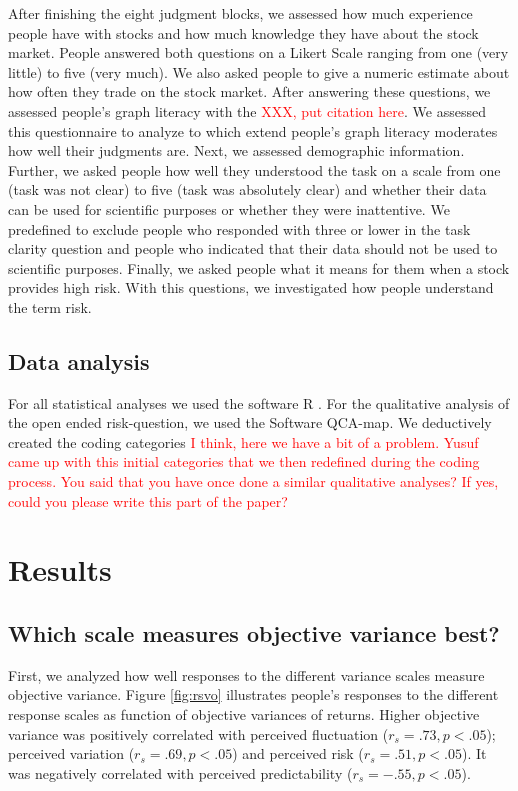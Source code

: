 \documentclass[a4paper,man, natbib,floatsintext]{apa6} %
\begin{document}
After finishing the eight judgment blocks, we assessed how much experience people have with stocks and how much knowledge they have about the stock market. People answered both questions on a Likert Scale ranging from one (very little) to five (very much). We also asked people to give a numeric estimate about how often they trade on the stock market. After answering these questions, we assessed people's graph literacy with the \textcolor{red}{XXX, put citation here}. We assessed this questionnaire to analyze to which extend people's graph literacy moderates how well their judgments are. Next, we assessed demographic information. Further, we asked people how well they understood the task on a scale from one (task was not clear) to five (task was absolutely clear) and whether their data can be used for scientific purposes or whether they were inattentive. We predefined to exclude people who responded with three or lower in the task clarity question and people who indicated that their data should not be used to scientific purposes. Finally, we asked people what it means for them when a stock provides high risk. With this questions, we investigated how people understand the term risk. 
\subsection{Data analysis}
For all statistical analyses we used the software R \citep{R2014}. For the qualitative analysis of the open ended risk-question, we used the Software QCA-map. We deductively created the coding categories \textcolor{red}{I think, here we have a bit of a problem. Yusuf came up with this initial categories that we then redefined during the coding process. You said that you have once done a similar qualitative analyses? If yes, could you please write this part of the paper?}



\section{Results}
\subsection{Which scale measures objective variance best?}
First, we analyzed how well responses to the different variance scales measure objective variance. Figure \ref{fig:rsvo} illustrates people's responses to the different response scales as function of objective variances of returns. Higher objective variance was positively correlated with perceived fluctuation ($r_{s} = .73, p < .05$);  perceived variation ($r_{s} = .69, p < .05$) and perceived risk ($r_{s} = .51, p < .05$). It was negatively correlated with perceived predictability ($r_{s} = -.55, p < .05$). 
\end{document}
